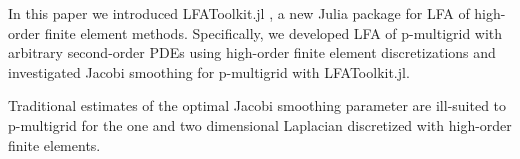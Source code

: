 \documentclass[review]{siamart190516}
\begin{document}
In this paper we introduced LFAToolkit.jl \cite{thompson2021toolkit}, a new Julia package for LFA of high-order finite element methods.
Specifically, we developed LFA of p-multigrid with arbitrary second-order PDEs using high-order finite element discretizations and investigated Jacobi smoothing for p-multigrid with LFAToolkit.jl.

Traditional estimates of the optimal Jacobi smoothing parameter are ill-suited to p-multigrid for the one and two dimensional Laplacian discretized with high-order finite elements.



\end{document}
